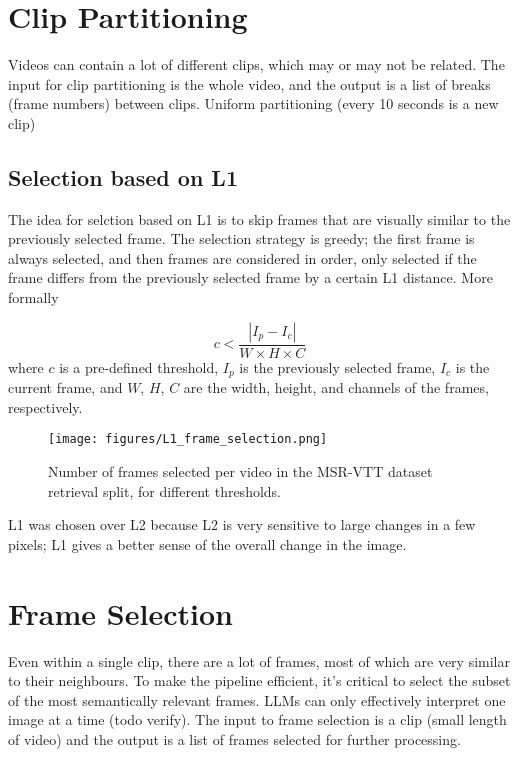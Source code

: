 \documentclass{article}
\begin{document}
\section{Clip Partitioning}

Videos can contain a lot of different clips, which may or may not be related.
The input for clip partitioning is the whole video, and the output is a list of breaks (frame numbers) between clips.
Uniform partitioning (every 10 seconds is a new clip)

\subsection{Selection based on L1}
The idea for selction based on L1 is to skip frames that are visually similar to the previously selected frame.
The selection strategy is greedy; the first frame is always selected, and then frames are considered in order, only selected if the frame differs from the previously selected frame by a certain L1 distance.
More formally

\begin{equation}
      c < \frac{|I_{p} - I_{c}|}{W \times H \times C}
\end{equation}
where $c$ is a pre-defined threshold, $I_{p}$ is the previously selected frame, $I_{c}$ is the current frame, and $W$, $H$, $C$ are the width, height, and channels of the frames, respectively.

\begin{figure}
      \centering
      \texttt{[image: figures/L1\_frame\_selection.png]}
      \caption{Number of frames selected per video in the MSR-VTT dataset retrieval split, for different thresholds.}
      \label{fig:optical_flow}
\end{figure}

L1 was chosen over L2 because L2 is very sensitive to large changes in a few pixels; L1 gives a better sense of the overall change in the image.


\section{Frame Selection}

Even within a single clip, there are a lot of frames, most of which are very similar to their neighbours.
To make the pipeline efficient, it's critical to select the subset of the most semantically relevant frames.
LLMs can only effectively interpret one image at a time (todo verify).
The input to frame selection is a clip (small length of video) and the output is a list of frames selected for further processing.
\end{document}

